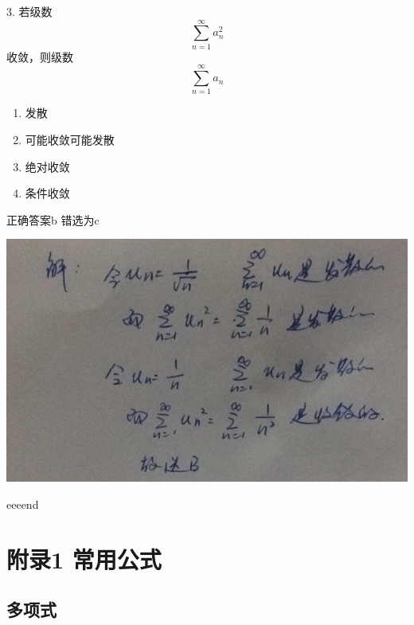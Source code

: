 \documentclass[fleqn]{article}
\begin{document}
\begin{flushleft}
3. 若级数$$\sum_{n=1}^{\infty}a_n^2$$收敛，则级数 $$\sum_{n=1}^{\infty}a_n$$
\begin{enumerate}
	\item 发散  
	\item 可能收敛可能发散
	\item 绝对收敛
	\item 条件收敛
\end{enumerate}
正确答案b 错选为c

\includegraphics[scale=0.5]{34.jpg}

eeeend
\newpage
\section{附录1 常用公式}
\subsection{多项式}

\end{flushleft}
\end{document}
